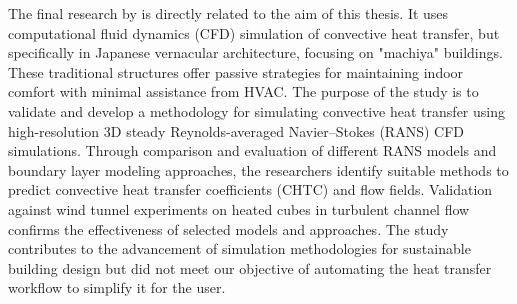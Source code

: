 The final research by \citeauthor{litrev2} \cite{litrev2} is directly related to the aim of this thesis. 
It uses computational fluid dynamics (CFD) simulation of convective heat transfer, but specifically in Japanese vernacular architecture, focusing on "machiya" buildings. These traditional structures offer passive strategies for maintaining indoor comfort with minimal assistance from HVAC. The purpose of the study is to validate and develop a methodology for simulating convective heat transfer using high-resolution 3D steady Reynolds-averaged Navier–Stokes (RANS) CFD simulations. Through comparison and evaluation of different \gls{RANS} models and boundary layer modeling approaches, the researchers identify suitable methods to predict convective heat transfer coefficients (\gls{CHTC}) and flow fields. Validation against wind tunnel experiments on heated cubes in turbulent channel flow confirms the effectiveness of selected models and approaches. The study contributes to the advancement of simulation methodologies for sustainable building design but did not meet our objective of automating the heat transfer workflow to simplify it for the user. 



